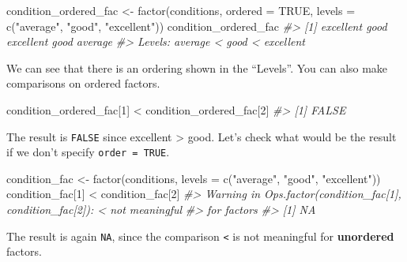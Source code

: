\documentclass[
]{book}
\newenvironment{Shaded}{\begin{snugshade}}{\end{snugshade}}
\newcommand{\AttributeTok}[1]{\textcolor[rgb]{0.77,0.63,0.00}{#1}}
\newcommand{\CommentTok}[1]{\textcolor[rgb]{0.56,0.35,0.01}{\textit{#1}}}
\newcommand{\ConstantTok}[1]{\textcolor[rgb]{0.00,0.00,0.00}{#1}}
\newcommand{\DecValTok}[1]{\textcolor[rgb]{0.00,0.00,0.81}{#1}}
\newcommand{\FunctionTok}[1]{\textcolor[rgb]{0.00,0.00,0.00}{#1}}
\newcommand{\NormalTok}[1]{#1}
\newcommand{\OtherTok}[1]{\textcolor[rgb]{0.56,0.35,0.01}{#1}}
\newcommand{\SpecialCharTok}[1]{\textcolor[rgb]{0.00,0.00,0.00}{#1}}
\newcommand{\StringTok}[1]{\textcolor[rgb]{0.31,0.60,0.02}{#1}}
\begin{document}
\begin{Shaded}
\begin{Highlighting}[]
\NormalTok{condition\_ordered\_fac }\OtherTok{\textless{}{-}} \FunctionTok{factor}\NormalTok{(conditions, }
                                \AttributeTok{ordered =} \ConstantTok{TRUE}\NormalTok{, }
                                \AttributeTok{levels =} \FunctionTok{c}\NormalTok{(}\StringTok{"average"}\NormalTok{, }\StringTok{"good"}\NormalTok{, }\StringTok{"excellent"}\NormalTok{))}
\NormalTok{condition\_ordered\_fac}
\CommentTok{\#\textgreater{} [1] excellent good      excellent good      average  }
\CommentTok{\#\textgreater{} Levels: average \textless{} good \textless{} excellent}
\end{Highlighting}
\end{Shaded}

We can see that there is an ordering shown in the ``Levels''. You can also make comparisons on ordered factors.

\begin{Shaded}
\begin{Highlighting}[]
\NormalTok{condition\_ordered\_fac[}\DecValTok{1}\NormalTok{] }\SpecialCharTok{\textless{}}\NormalTok{ condition\_ordered\_fac[}\DecValTok{2}\NormalTok{]}
\CommentTok{\#\textgreater{} [1] FALSE}
\end{Highlighting}
\end{Shaded}

The result is \texttt{FALSE} since excellent \textgreater{} good. Let's check what would be the result if we don't specify \texttt{order\ =\ TRUE}.

\begin{Shaded}
\begin{Highlighting}[]
\NormalTok{condition\_fac }\OtherTok{\textless{}{-}} \FunctionTok{factor}\NormalTok{(conditions, }
                        \AttributeTok{levels =} \FunctionTok{c}\NormalTok{(}\StringTok{"average"}\NormalTok{, }\StringTok{"good"}\NormalTok{, }\StringTok{"excellent"}\NormalTok{))}
\NormalTok{condition\_fac[}\DecValTok{1}\NormalTok{] }\SpecialCharTok{\textless{}}\NormalTok{ condition\_fac[}\DecValTok{2}\NormalTok{]}
\CommentTok{\#\textgreater{} Warning in Ops.factor(condition\_fac[1], condition\_fac[2]): \textquotesingle{}\textless{}\textquotesingle{} not meaningful}
\CommentTok{\#\textgreater{} for factors}
\CommentTok{\#\textgreater{} [1] NA}
\end{Highlighting}
\end{Shaded}

The result is again \texttt{NA}, since the comparison \texttt{\textless{}} is not meaningful for \textbf{unordered} factors.
\end{document}
